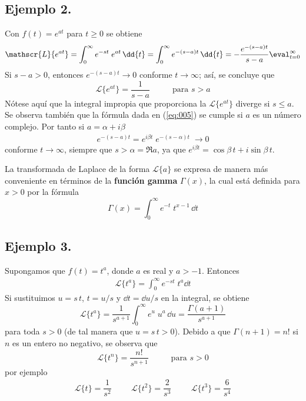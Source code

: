 \subsection*{Ejemplo 2.}
Con $f(t) = e^{at}$ para $t \geq 0$ se obtiene
\begin{align*}
\mathscr{L} \{ e^{at} \} = \int_{0}^{\infty} e^{-st} \; e^{at} \, \dd{t} = \int_{0}^{\infty} e^{-(s - a)t} \, \dd{t} = - \dfrac{e^{-(s - a)t}}{s - a} \eval_{t=0}^{\infty} 
\end{align*}
Si $s -a > 0$, entonces $e^{-(s - a) t} \to 0$ conforme $t \to \infty$; así, se concluye que
\begin{equation}
\mathscr{L} \{ e^{at} \} = \dfrac{1}{s - a} \hspace{1cm} \mbox{ para } s > a
\label{eq:005}
\end{equation}
Nótese aquí que la integral impropia que proporciona la $\mathscr{L} \{ e^{at} \}$ diverge si $s \leq a$. Se observa también que la fórmula dada en (\ref{eq:005}) se cumple si $a$ es un número complejo. Por tanto si $a = \alpha + i \beta$
\begin{align*}
e^{-(s - a)t} = e^{i \beta t} \; e^{-(s - \alpha) t} \; \to 0
\end{align*}
conforme $t \to \infty$, siempre que $s > \alpha = \Re{a}$, ya que $e^{i \beta t} = \cos \beta \, t + i \sin \beta \, t$.
\par
La transformada de Laplace de la forma $\mathscr{L} \{ a \}$ se expresa de manera más conveniente en términos de la \textbf{función gamma} $\Gamma(x)$, la cual está definida para $x > 0$ por la fórmula
\begin{equation}
\Gamma (x) = \int_{0}^{\infty} e^{-t} \; t^{x-1} \, \dd t
\label{eq:006}
\end{equation}
\subsection*{Ejemplo 3.}
Supongamos que $f(t) = t^{a}$, donde $a$ es real y $a > -1$. Entonces
\begin{align*}
\mathscr{L} \{ t^{a} \} = \int_{0}^{\infty} e^{-st} \; t^{a} \dd{t}
\end{align*}
Si sustituimos $u = s \, t$, $t =  u/s$ y $\dd{t} = \dd{u}/s$ en la integral, se obtiene
\begin{equation}
\mathscr{L} \{ t^{a} \} =  \dfrac{1}{s^{a+1}} \int_{0}^{\infty} e^{u} \; u^{a} \, \dd u = \dfrac{\Gamma(a + 1)}{s^{a + 1}}
\label{eq:010}
\end{equation}
para toda $s > 0$ (de tal manera que $u = s \, t > 0$). Debido a que $\Gamma(n+1) = n!$ si $n$ es un entero no negativo, se observa que
\begin{equation}
\mathscr{L} \{ t^{n} \} = \dfrac{n!}{s^{n+1}} \hspace{1cm} \mbox{ para } s > 0
\label{eq:011}
\end{equation}
por ejemplo
\begin{align*}
\mathscr{L} \{ t \} = \dfrac{1}{s^{2}} \hspace{1cm} \mathscr{L} \{ t^{2} \} = \dfrac{2}{s^{3}} \hspace{1cm} \mathscr{L} \{ t^{3} \} = \dfrac{6}{s^{4}}
\end{align*}
